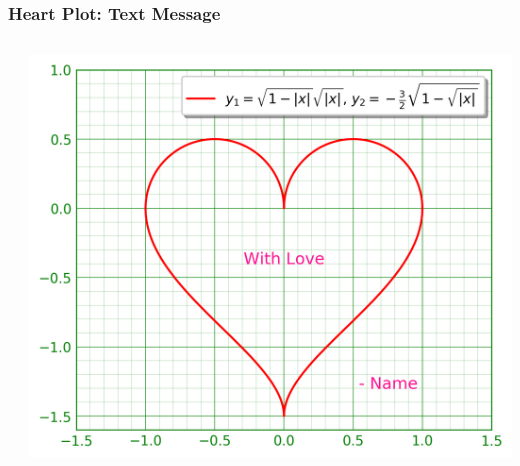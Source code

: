 \documentclass[xcolor={svgnames}]{beamer}
\newcommand{\pyfile}[2][]{}
\begin{document}
\begin{frame}[t,fragile]
    \frametitle{Heart Plot: Text Message}
    \vspace{-2mm}
    \begin{columns}[T]
        \begin{column}{0.47\textwidth}
            \pyfile[style=tiny,linerange=30]{examples/heart-8.py}
        \end{column}
        \begin{column}{0.53\textwidth}
            \includegraphics[width=\textwidth]{img/heart-8.png}
        \end{column}
    \end{columns}
\end{frame}
\end{document}
